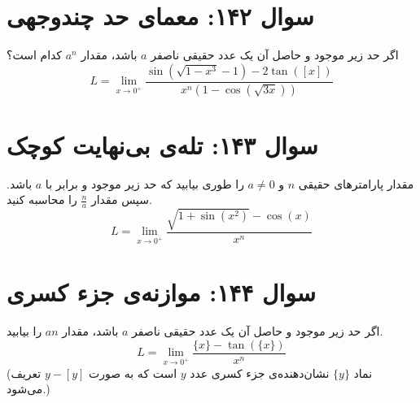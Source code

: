 \documentclass[12pt]{article}
\begin{document}
\section*{سوال ۱۴۲: معمای حد چندوجهی}
اگر حد زیر موجود و حاصل آن یک عدد حقیقی ناصفر \(a\) باشد، مقدار \(a^n\) کدام است؟
\begin{displaymath}
	L = \lim_{x \to 0^+} \frac{\sin(\sqrt{1-x^3}-1) - 2\tan([x])}{x^n(1-\cos(\sqrt{3x}))}
\end{displaymath}

\vspace{1cm}
\hrulefill
\vspace{1cm}

\section*{سوال ۱۴۳: تله‌ی بی‌نهایت کوچک}
مقدار پارامترهای حقیقی \(n\) و \(a \ne 0\) را طوری بیابید که حد زیر موجود و برابر با \(a\) باشد. سپس مقدار \( \frac{n}{a} \) را محاسبه کنید.
\begin{displaymath}
	L = \lim_{x \to 0^+} \frac{\sqrt{1+\sin(x^2)} - \cos(x)}{x^n}
\end{displaymath}

\vspace{1cm}
\hrulefill
\vspace{1cm}

\section*{سوال ۱۴۴: موازنه‌ی جزء کسری}
اگر حد زیر موجود و حاصل آن یک عدد حقیقی ناصفر \(a\) باشد، مقدار \(an\) را بیابید.
\begin{displaymath}
	L = \lim_{x \to 0^+} \frac{\{x\} - \tan(\{x\})}{x^n}
\end{displaymath}
(نماد \( \{y\} \) نشان‌دهنده‌ی جزء کسری عدد \(y\) است که به صورت \( y - [y] \) تعریف می‌شود.)

\vspace{1cm}
\hrulefill
\vspace{1cm}
\end{document}
